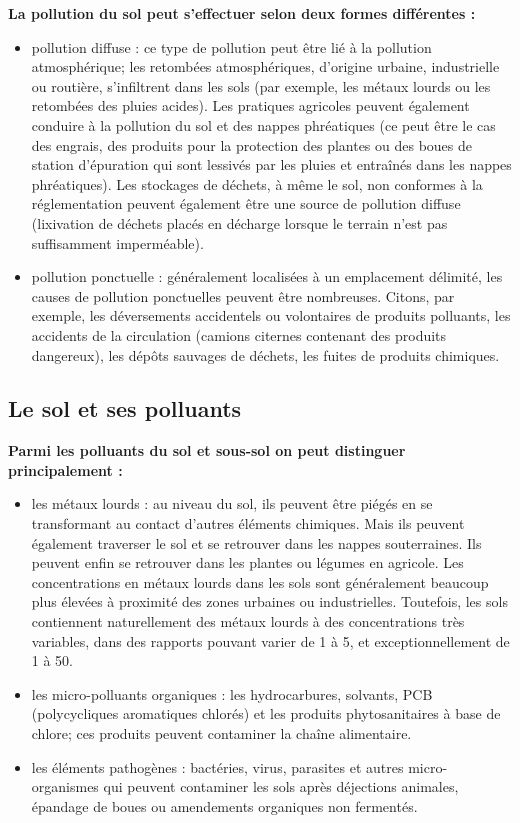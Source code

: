 \vspace{0.3cm}
\textbf{La pollution du sol peut s’effectuer selon deux formes différentes :}
\begin{itemize}

\item pollution diffuse : ce type de pollution peut être lié à la pollution atmosphérique; les retombées atmosphériques, d’origine urbaine, industrielle ou routière, s’infiltrent dans les sols (par exemple, les métaux lourds ou les retombées des pluies acides). Les pratiques agricoles peuvent également conduire à la pollution du sol et des nappes phréatiques (ce peut être le cas des engrais, des produits pour la protection des plantes ou des boues de station d’épuration qui sont lessivés par les pluies et entraînés dans les nappes phréatiques). Les stockages de déchets, à même le sol, non conformes à la réglementation peuvent également être une source de pollution diffuse (lixivation de déchets placés en décharge lorsque le terrain n’est pas suffisamment imperméable).
\item pollution ponctuelle : généralement localisées à un emplacement délimité, les causes de pollution ponctuelles peuvent être nombreuses. Citons, par exemple, les déversements accidentels ou volontaires de produits polluants, les accidents de la circulation (camions citernes contenant des produits dangereux), les dépôts sauvages de déchets, les fuites de produits chimiques.
\end{itemize}


\subsection{Le sol et ses polluants} 

\textbf{Parmi les polluants du sol et sous-sol on peut distinguer principalement :}

\begin{itemize}
\item les métaux lourds : au niveau du sol, ils peuvent être piégés en se transformant au contact d’autres éléments chimiques. Mais ils peuvent également traverser le sol et se retrouver dans les nappes souterraines. Ils peuvent enfin se retrouver dans les plantes ou légumes en agricole. Les concentrations en métaux lourds dans les sols sont généralement beaucoup plus élevées à proximité des zones urbaines ou industrielles. Toutefois, les sols contiennent naturellement des métaux lourds à des concentrations très variables, dans des rapports pouvant varier de 1 à 5, et exceptionnellement de 1 à 50.
\item les micro-polluants organiques : les hydrocarbures, solvants, PCB (polycycliques aromatiques chlorés) et les produits phytosanitaires à base de chlore; ces produits peuvent contaminer la chaîne alimentaire.
\item les éléments pathogènes : bactéries, virus, parasites et autres micro-organismes qui peuvent contaminer les sols après déjections animales, épandage de boues ou amendements organiques non fermentés.
\end{itemize}

